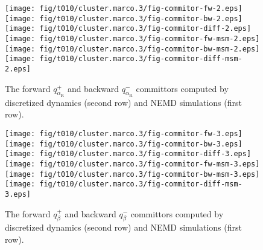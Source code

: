\documentclass[aps, pre, preprint,unsortedaddress,a4paper,onecolumn]{revtex4}
\newcommand{\fwd}[0]{+}
\newcommand{\bwd}[0]{-}
\newcommand{\confaa}[0]{{\alpha_{\textrm{R}}}}
\begin{document}
\begin{figure}
  \centering
  \texttt{[image: fig/t010/cluster.marco.3/fig-commitor-fw-2.eps]}
  \texttt{[image: fig/t010/cluster.marco.3/fig-commitor-bw-2.eps]}
  \texttt{[image: fig/t010/cluster.marco.3/fig-commitor-diff-2.eps]}\\
  \texttt{[image: fig/t010/cluster.marco.3/fig-commitor-fw-msm-2.eps]}
  \texttt{[image: fig/t010/cluster.marco.3/fig-commitor-bw-msm-2.eps]}
  \texttt{[image: fig/t010/cluster.marco.3/fig-commitor-diff-msm-2.eps]}
  \caption{The forward $q^\fwd_{\confaa}$ and backward
    $q^\bwd_{\confaa}$ committors computed by discretized dynamics (second row) and NEMD
    simulations (first row).}
  \label{fig:num-4}
\end{figure}

\begin{figure}
  \centering
  \texttt{[image: fig/t010/cluster.marco.3/fig-commitor-fw-3.eps]}
  \texttt{[image: fig/t010/cluster.marco.3/fig-commitor-bw-3.eps]}
  \texttt{[image: fig/t010/cluster.marco.3/fig-commitor-diff-3.eps]}\\
  \texttt{[image: fig/t010/cluster.marco.3/fig-commitor-fw-msm-3.eps]}
  \texttt{[image: fig/t010/cluster.marco.3/fig-commitor-bw-msm-3.eps]}
  \texttt{[image: fig/t010/cluster.marco.3/fig-commitor-diff-msm-3.eps]}
  \caption{The forward $q^\fwd_{\beta}$ and backward $q^\bwd_{\beta}$
    committors computed by discretized dynamics (second row) and  NEMD
    simulations (first row).}
  \label{fig:num-5}
\end{figure}
\end{document}
